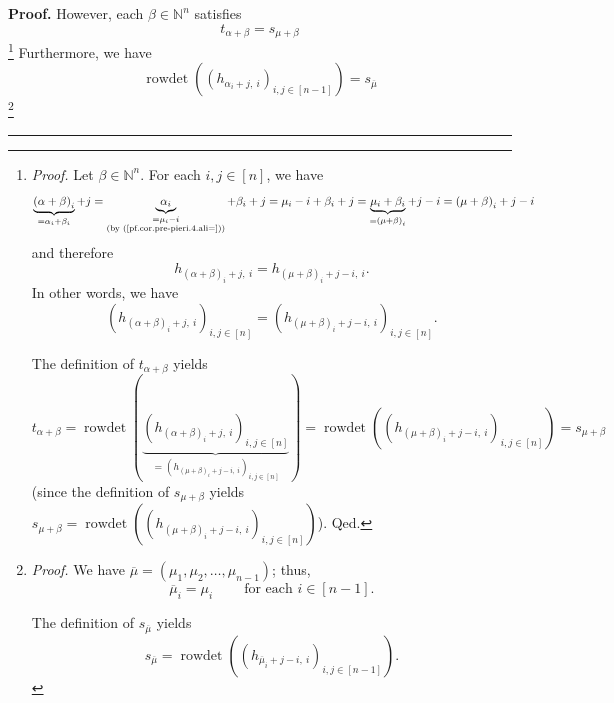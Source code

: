 \documentclass
[numbers=enddot,12pt,final,onecolumn,notitlepage,english]{scrartcl}%
\theoremstyle{definition}
\newenvironment{proof}[1][Proof]{\noindent\textbf{#1.} }{\ \rule{0.5em}{0.5em}}
\newenvironment{verlong}{}{}
\begin{document}
\begin{proof}
\begin{verlong}
However, each $\beta\in\mathbb{N}^{n}$ satisfies
\begin{equation}
t_{\alpha+\beta}=s_{\mu+\beta} \label{pf.cor.pre-pieri.4.3}%
\end{equation}
\footnote{\textit{Proof.} Let $\beta\in\mathbb{N}^{n}$. For each
$i,j\in\left[  n\right]  $, we have%
\[
\underbrace{\left(  \alpha+\beta\right)  _{i}}_{=\alpha_{i}+\beta_{i}%
}+j=\underbrace{\alpha_{i}}_{\substack{=\mu_{i}-i\\\text{(by
(\ref{pf.cor.pre-pieri.4.ali=}))}}}+\beta_{i}+j=\mu_{i}-i+\beta_{i}%
+j=\underbrace{\mu_{i}+\beta_{i}}_{=\left(  \mu+\beta\right)  _{i}%
}+j-i=\left(  \mu+\beta\right)  _{i}+j-i
\]
and therefore
\[
h_{\left(  \alpha+\beta\right)  _{i}+j,\ i}=h_{\left(  \mu+\beta\right)
_{i}+j-i,\ i}.
\]
In other words, we have%
\[
\left(  h_{\left(  \alpha+\beta\right)  _{i}+j,\ i}\right)  _{i,j\in\left[
n\right]  }=\left(  h_{\left(  \mu+\beta\right)  _{i}+j-i,\ i}\right)
_{i,j\in\left[  n\right]  }.
\]
\par
The definition of $t_{\alpha+\beta}$ yields
\[
t_{\alpha+\beta}=\operatorname*{rowdet}\left(  \underbrace{\left(  h_{\left(
\alpha+\beta\right)  _{i}+j,\ i}\right)  _{i,j\in\left[  n\right]  }%
}_{=\left(  h_{\left(  \mu+\beta\right)  _{i}+j-i,\ i}\right)  _{i,j\in\left[
n\right]  }}\right)  =\operatorname*{rowdet}\left(  \left(  h_{\left(
\mu+\beta\right)  _{i}+j-i,\ i}\right)  _{i,j\in\left[  n\right]  }\right)
=s_{\mu+\beta}%
\]
(since the definition of $s_{\mu+\beta}$ yields $s_{\mu+\beta}%
=\operatorname*{rowdet}\left(  \left(  h_{\left(  \mu+\beta\right)
_{i}+j-i,\ i}\right)  _{i,j\in\left[  n\right]  }\right)  $). Qed.}
Furthermore, we have
\begin{equation}
\operatorname*{rowdet}\left(  \left(  h_{\alpha_{i}+j,\ i}\right)
_{i,j\in\left[  n-1\right]  }\right)  =s_{\overline{\mu}}
\label{pf.cor.pre-pieri.4.4}%
\end{equation}
\footnote{\textit{Proof.} We have $\overline{\mu}=\left(  \mu_{1},\mu
_{2},\ldots,\mu_{n-1}\right)  $; thus,
\begin{equation}
\overline{\mu}_{i}=\mu_{i}\ \ \ \ \ \ \ \ \ \ \text{for each }i\in\left[
n-1\right]  . \label{pf.cor.pre-pieri.4.4.pf.1}%
\end{equation}
\par
The definition of $s_{\overline{\mu}}$ yields%
\begin{equation}
s_{\overline{\mu}}=\operatorname*{rowdet}\left(  \left(  h_{\overline{\mu}%
_{i}+j-i,\ i}\right)  _{i,j\in\left[  n-1\right]  }\right)  .

\end{equation}}
\end{verlong}
\end{proof}
\end{document}
